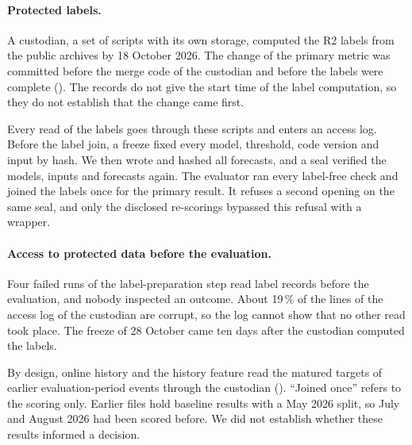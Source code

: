 \paragraph{Protected labels.}
A custodian, a set of scripts with its own storage, computed the R2 labels from the public archives by 18 October 2026.
The change of the primary metric was committed before the merge code of the custodian and before the labels were complete ().
The records do not give the start time of the label computation, so they do not establish that the change came first.


Every read of the labels goes through these scripts and enters an access log.
Before the label join, a freeze fixed every model, threshold, code version and input by hash.
We then wrote and hashed all forecasts, and a seal verified the models, inputs and forecasts again.
The evaluator ran every label-free check and joined the labels once for the primary result.
It refuses a second opening on the same seal, and only the disclosed re-scorings bypassed this refusal with a wrapper.

\paragraph{Access to protected data before the evaluation.}
Four failed runs of the label-preparation step read label records before the evaluation, and nobody inspected an outcome.
About 19\,\% of the lines of the access log of the custodian are corrupt, so the log cannot show that no other read took place.
The freeze of 28 October came ten days after the custodian computed the labels.

By design, online history and the history feature read the matured targets of earlier evaluation-period events through the custodian ().
``Joined once'' refers to the scoring only.
Earlier files hold baseline results with a May 2026 split, so July and August 2026 had been scored before.
We did not establish whether these results informed a decision.

